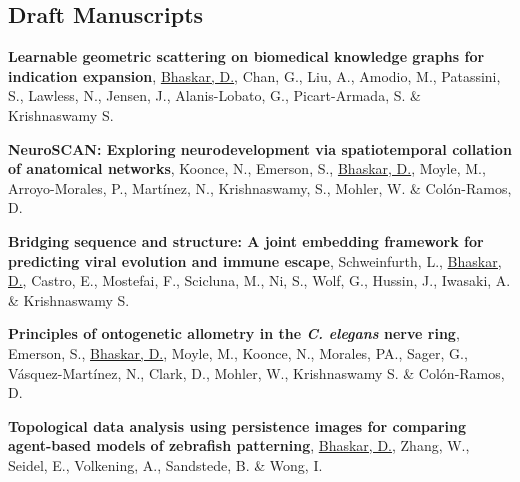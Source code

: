 \documentclass[margin,line]{res}
\begin{document}
\begin{resume}
\section{\sc Draft Manuscripts}
{
\renewcommand\leftmargini{0em}
\renewcommand{\labelenumi}{D\theenumi}
\begin{etaremune}[start=5]
\item{\bf Learnable geometric scattering on biomedical knowledge graphs for indication expansion},
\underline{Bhaskar, D.}, Chan, G., Liu, A., Amodio, M., Patassini, S., Lawless, N., Jensen, J., Alanis-Lobato, G., Picart-Armada, S. \& Krishnaswamy S.
\vspace*{.1cm}
\item{\bf NeuroSCAN: Exploring neurodevelopment via spatiotemporal collation of anatomical networks},
Koonce, N., Emerson, S., \underline{Bhaskar, D.}, Moyle, M., Arroyo-Morales, P., Martínez, N., Krishnaswamy, S., Mohler, W. \& Col\'{o}n-Ramos, D.
\vspace*{.1cm}
\item{\bf Bridging sequence and structure: A joint embedding framework for predicting viral evolution and immune escape},
Schweinfurth, L., \underline{Bhaskar, D.}, Castro, E., Mostefai, F., Scicluna, M., Ni, S., Wolf, G., Hussin, J., Iwasaki, A. \& Krishnaswamy S.
\vspace*{.1cm}
\item{\bf Principles of ontogenetic allometry in the \textit{C. elegans} nerve ring},
Emerson, S., \underline{Bhaskar, D.}, Moyle, M., Koonce, N., Morales, PA., Sager, G., V\'{a}squez-Mart\'{i}nez, N., Clark, D., Mohler, W., Krishnaswamy S. \& Col\'{o}n-Ramos, D.
\vspace*{.1cm}
\item{\bf Topological data analysis using persistence images for comparing agent-based models of zebrafish patterning},
\underline{Bhaskar, D.}, Zhang, W., Seidel, E., Volkening, A., Sandstede, B. \& Wong, I.
\end{etaremune}
}



\end{resume}
\end{document}
